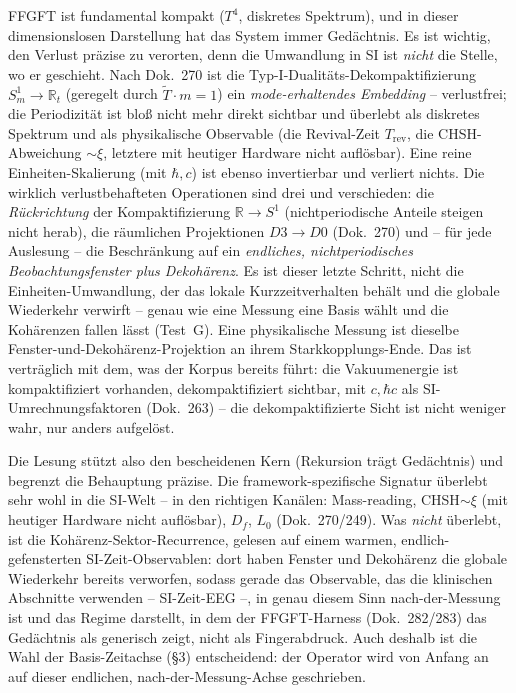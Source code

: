 FFGFT ist fundamental kompakt ($T^4$, diskretes Spektrum), und in dieser dimensionslosen
Darstellung hat das System immer Gedächtnis. Es ist wichtig, den Verlust präzise zu
verorten, denn die Umwandlung in SI ist \emph{nicht} die Stelle, wo er geschieht. Nach
Dok.~270 ist die Typ-I-Dualitäts-Dekompaktifizierung $S^1_m\!\to\!\mathbb{R}_t$ (geregelt
durch $\tilde{T}\cdot m=1$) ein \emph{mode-erhaltendes Embedding} -- verlustfrei; die
Periodizität ist bloß nicht mehr direkt sichtbar und überlebt als diskretes Spektrum und
als physikalische Observable (die Revival-Zeit $T_\text{rev}$, die CHSH-Abweichung
$\sim\xi$, letztere mit heutiger Hardware nicht auflösbar). Eine reine Einheiten-Skalierung (mit $\hbar,c$) ist ebenso invertierbar und
verliert nichts. Die wirklich verlustbehafteten Operationen sind drei und verschieden: die
\emph{Rückrichtung} der Kompaktifizierung $\mathbb{R}\!\to\!S^1$ (nichtperiodische Anteile
steigen nicht herab), die räumlichen Projektionen $D3\!\to\!D0$ (Dok.~270) und -- für jede
Auslesung -- die Beschränkung auf ein \emph{endliches, nichtperiodisches Beobachtungsfenster
plus Dekohärenz}. Es ist dieser letzte Schritt, nicht die Einheiten-Umwandlung, der das
lokale Kurzzeitverhalten behält und die globale Wiederkehr verwirft -- genau wie eine
Messung eine Basis wählt und die Kohärenzen fallen lässt (Test~G). Eine physikalische
Messung ist dieselbe Fenster-und-Dekohärenz-Projektion an ihrem Starkkopplungs-Ende. Das ist
verträglich mit dem, was der Korpus bereits führt: die Vakuumenergie ist kompaktifiziert
vorhanden, dekompaktifiziert sichtbar, mit $c,\hbar c$ als SI-Umrechnungsfaktoren (Dok.~263)
-- die dekompaktifizierte Sicht ist nicht weniger wahr, nur anders aufgelöst.

Die Lesung stützt also den bescheidenen Kern (Rekursion trägt Gedächtnis) und begrenzt die
Behauptung präzise. Die framework-spezifische Signatur überlebt sehr wohl in die SI-Welt --
in den richtigen Kanälen: Mass-reading, CHSH$\sim\xi$ (mit heutiger Hardware nicht auflösbar), $D_f$, $L_0$ (Dok.~270/249). Was
\emph{nicht} überlebt, ist die Kohärenz-Sektor-Recurrence, gelesen auf einem warmen,
endlich-gefensterten SI-Zeit-Observablen: dort haben Fenster und Dekohärenz die globale
Wiederkehr bereits verworfen, sodass gerade das Observable, das die klinischen Abschnitte
verwenden -- SI-Zeit-EEG --, in genau diesem Sinn nach-der-Messung ist und das Regime
darstellt, in dem der FFGFT-Harness (Dok.~282/283) das Gedächtnis als generisch zeigt, nicht
als Fingerabdruck. Auch deshalb ist die Wahl der Basis-Zeitachse (\S3) entscheidend: der
Operator wird von Anfang an auf dieser endlichen, nach-der-Messung-Achse geschrieben.

